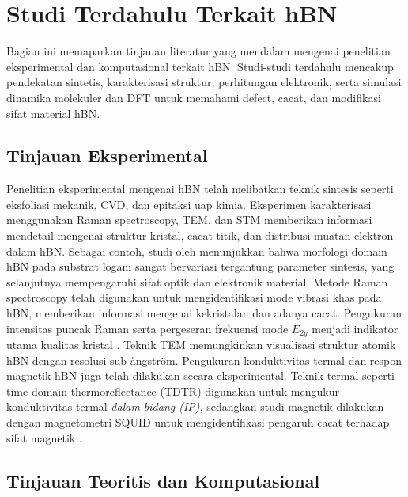 \section{Studi Terdahulu Terkait hBN}
Bagian ini memaparkan tinjauan literatur yang mendalam mengenai penelitian eksperimental dan komputasional terkait hBN. Studi-studi terdahulu mencakup pendekatan sintetis, karakterisasi struktur, perhitungan elektronik, serta simulasi dinamika molekuler dan DFT untuk memahami defect, cacat, dan modifikasi sifat material hBN. \subsection{Tinjauan Eksperimental}
Penelitian eksperimental mengenai hBN telah melibatkan teknik sintesis seperti eksfoliasi mekanik, CVD, dan epitaksi uap kimia. Eksperimen karakterisasi menggunakan Raman spectroscopy, TEM, dan STM memberikan informasi mendetail mengenai struktur kristal, cacat titik, dan distribusi muatan elektron dalam hBN. Sebagai contoh, studi oleh \citep{Bhimanapati2016} menunjukkan bahwa morfologi domain hBN pada substrat logam sangat bervariasi tergantung parameter sintesis, yang selanjutnya mempengaruhi sifat optik dan elektronik material. Metode Raman spectroscopy telah digunakan untuk mengidentifikasi mode vibrasi khas pada hBN, memberikan informasi mengenai kekristalan dan adanya cacat. Pengukuran intensitas puncak Raman serta pergeseran frekuensi mode \(E_{2g}\) menjadi indikator utama kualitas kristal \citep{Wang2017}. Teknik TEM memungkinkan visualisasi struktur atomik hBN dengan resolusi sub-ångström. Pengukuran konduktivitas termal dan respon magnetik hBN juga telah dilakukan secara eksperimental. Teknik termal seperti time-domain thermoreflectance (TDTR) digunakan untuk mengukur konduktivitas termal \emph{dalam bidang (IP)}, sedangkan studi magnetik dilakukan dengan magnetometri SQUID untuk mengidentifikasi pengaruh cacat terhadap sifat magnetik \citep{Zhang2020}. \subsection{Tinjauan Teoritis dan Komputasional}
